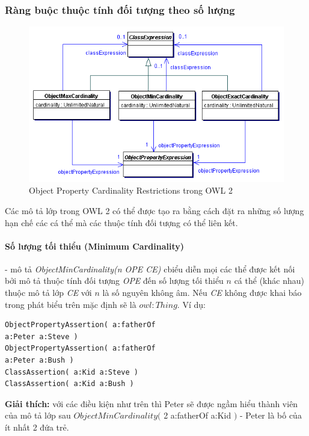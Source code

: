 \subsubsection{Ràng buộc thuộc tính đối tượng theo số lượng}
\begin{figure}[h]
	\centering
	\includegraphics[width=150mm]{Figures/ce_2.png}
	\caption{Object Property Cardinality Restrictions trong OWL 2\label{overflow}}
\end{figure}
Các mô tả lớp trong OWL 2 có thể được tạo ra bằng cách đặt ra những số lượng hạn chế các cá thể mà các thuộc tính đối tượng có thể liên kết.
\paragraph{Số lượng tối thiểu (Minimum Cardinality)} - mô tả \textit{ObjectMinCardinality(n OPE  CE)} cbiểu diễn mọi các thể được kết nối bởi mô tả thuộc tính đối tượng \textit{OPE} đến số lượng tối thiểu $n$ cá thể (khác nhau) thuộc mô tả lớp \textit{CE} với $n$ là số nguyên không âm. Nếu \textit{CE} không được khai báo trong phát biểu trên mặc định sẽ là $owl:Thing$. Ví dụ:
\begin{verbatim}
ObjectPropertyAssertion( a:fatherOf 
a:Peter a:Steve )
ObjectPropertyAssertion( a:fatherOf 
a:Peter a:Bush )
ClassAssertion( a:Kid a:Steve )
ClassAssertion( a:Kid a:Bush )
\end{verbatim}
\textbf{Giải thích:} với các điều kiện như trên thì Peter sẽ được ngầm hiểu thành viên của mô tả lớp sau 
$ObjectMinCardinality($ 2 a:fatherOf a:Kid $)$ - Peter là bố của ít nhất 2 đứa trẻ.

